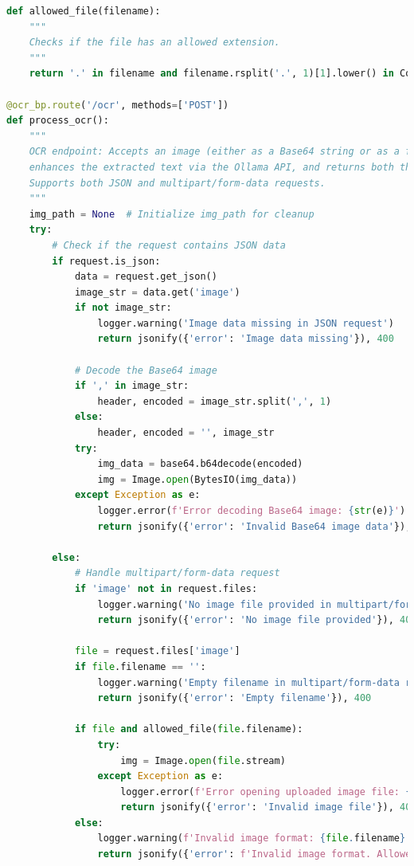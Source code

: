 \begin{lstlisting}[language=Python, caption={OCR Endpoint}]
def allowed_file(filename):
    """
    Checks if the file has an allowed extension.
    """
    return '.' in filename and filename.rsplit('.', 1)[1].lower() in Config.ALLOWED_EXTENSIONS

@ocr_bp.route('/ocr', methods=['POST'])
def process_ocr():
    """
    OCR endpoint: Accepts an image (either as a Base64 string or as a file), extracts text using OCR,
    enhances the extracted text via the Ollama API, and returns both the raw and improved text.
    Supports both JSON and multipart/form-data requests.
    """
    img_path = None  # Initialize img_path for cleanup
    try:
        # Check if the request contains JSON data
        if request.is_json:
            data = request.get_json()
            image_str = data.get('image')
            if not image_str:
                logger.warning('Image data missing in JSON request')
                return jsonify({'error': 'Image data missing'}), 400

            # Decode the Base64 image
            if ',' in image_str:
                header, encoded = image_str.split(',', 1)
            else:
                header, encoded = '', image_str
            try:
                img_data = base64.b64decode(encoded)
                img = Image.open(BytesIO(img_data))
            except Exception as e:
                logger.error(f'Error decoding Base64 image: {str(e)}')
                return jsonify({'error': 'Invalid Base64 image data'}), 400

        else:
            # Handle multipart/form-data request
            if 'image' not in request.files:
                logger.warning('No image file provided in multipart/form-data request')
                return jsonify({'error': 'No image file provided'}), 400

            file = request.files['image']
            if file.filename == '':
                logger.warning('Empty filename in multipart/form-data request')
                return jsonify({'error': 'Empty filename'}), 400

            if file and allowed_file(file.filename):
                try:
                    img = Image.open(file.stream)
                except Exception as e:
                    logger.error(f'Error opening uploaded image file: {str(e)}')
                    return jsonify({'error': 'Invalid image file'}), 400
            else:
                logger.warning(f'Invalid image format: {file.filename}')
                return jsonify({'error': f'Invalid image format. Allowed: {", ".join(Config.ALLOWED_EXTENSIONS)}'}), 400


\end{lstlisting}

